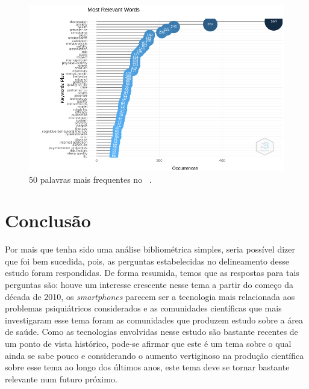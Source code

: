 \begin{figure}[htp]
    \centering
    \includegraphics[angle=0,width=1\textwidth]{experiments/GustavoMacCar/AnaliseBibliometrica/PsychDiseasesTech/mfw.png}
    \caption{50 palavras mais frequentes no \dataset\ .}
    \label{fig:psych:mfw}
\end{figure}

\section{Conclusão}
Por mais que tenha sido uma análise bibliométrica simples, seria possível dizer que foi bem sucedida, pois, as perguntas estabelecidas no delineamento desse estudo foram respondidas. De forma resumida, temos que as respostas para tais perguntas são: houve um interesse crescente nesse tema a partir do começo da década de 2010, os \textit{smartphones} parecem ser a tecnologia mais relacionada aos problemas psiquiátricos considerados e as comunidades científicas que mais investigaram esse tema foram as comunidades que produzem estudo sobre a área de saúde.
Como as tecnologias envolvidas nesse estudo são bastante recentes de um ponto de vista histórico, pode-se afirmar que este é um tema sobre o qual ainda se sabe pouco e considerando o aumento vertiginoso na produção científica sobre esse tema ao longo dos últimos anos, este tema deve se tornar bastante relevante num futuro próximo.